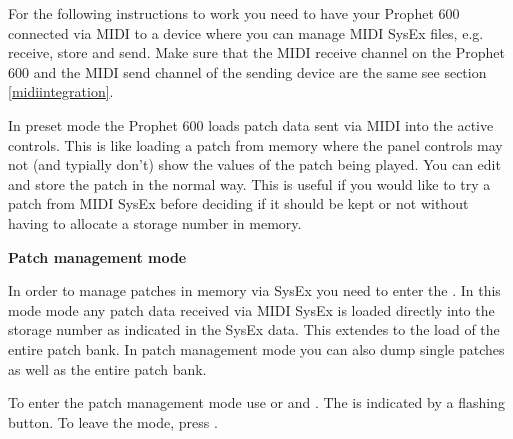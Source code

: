 
For the following instructions to work you need to have your Prophet 600 connected via MIDI to a device where you can manage MIDI SysEx files, e.g. receive, store and send. Make sure that the MIDI receive channel on the Prophet 600 and the MIDI send channel of the sending device are the same see section \ref{midiintegration}.

In preset mode the Prophet 600 loads patch data sent via MIDI into the active controls. This is like loading a patch from memory where the panel controls may not (and typially don't) show the values of the patch being played. You can edit and store the patch in the normal way. This is useful if you would like to try a patch from MIDI SysEx before deciding if it should be kept or not without having to allocate a storage number in memory. 

\textbf{Patch management mode}

In order to manage patches in memory via SysEx you need to enter the \patchmgmt. In this mode mode any patch data received via MIDI SysEx is loaded directly into the storage number as indicated in the SysEx data. This extendes to the load of the entire patch bank. In patch management mode you can also dump single patches as well as the entire patch bank. 

To enter the patch management mode use \shiftmode or \shiftlock and \record. The \patchmgmt is indicated by a flashing \preset button. To leave the mode, press \record. 

